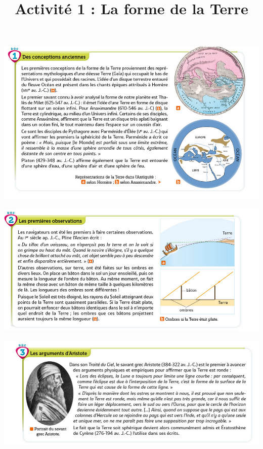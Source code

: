 \documentclass[10pt]{article}
\newcommand{\titreActivite}{Activité 1 : La forme de la Terre} %
\newcommand{\myscale}{0.46}
\begin{document}
\date{}
\title{\titreActivite}
\maketitle %


\begin{center}
 	\includegraphics[scale=\myscale]{assets/d1.png}

 	\includegraphics[scale=\myscale]{assets/d2.png}

    \includegraphics[scale=\myscale]{assets/d3.png}


\end{center}
\end{document}
